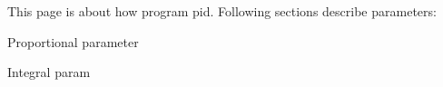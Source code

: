 This page is about how program pid. Following sections describe parameters\+:
\begin{DoxyItemize}
\item Proportional parameter
\item Integral param 
\end{DoxyItemize}